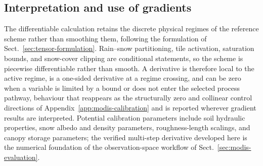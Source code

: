 \subsection{Interpretation and use of gradients}
\label{sec:gradient-interpretation}

The differentiable calculation retains the discrete physical regimes of the
reference scheme rather than smoothing them, following the formulation of
Sect.~\ref{sec:tensor-formulation}. Rain--snow partitioning, tile activation,
saturation bounds, and snow-cover clipping are
conditional statements, so the scheme is piecewise differentiable rather than
smooth. A derivative is therefore local to the active regime, is a one-sided
derivative at a regime crossing, and can be zero when a variable is limited
by a bound or does not enter the selected process pathway, behaviour that
reappears as the structurally zero and collinear control directions of
Appendix~\ref{app:modis-calibration} and is reported wherever gradient results
are interpreted. Potential calibration parameters include soil hydraulic
properties, snow albedo and density parameters, roughness-length scalings,
and canopy storage parameters; the verified multi-step derivative developed
here is the numerical foundation of the observation-space workflow of
Sect.~\ref{sec:modis-evaluation}.
